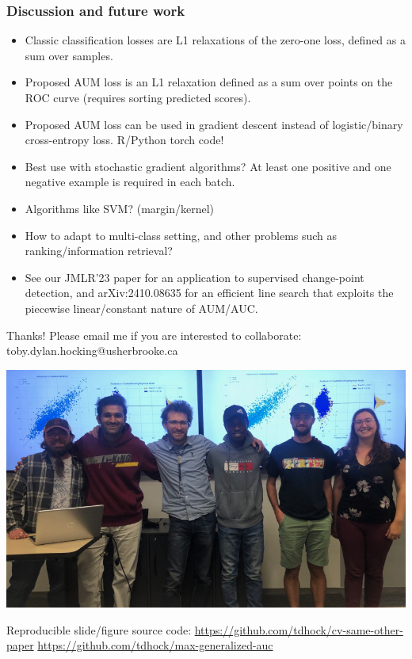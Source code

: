 \documentclass[t]{beamer}
\begin{document}
\begin{frame}
  \frametitle{Discussion and future work}
  \begin{itemize}
  \item Classic classification losses are L1 relaxations of the zero-one loss, defined as a sum over samples.
  \item Proposed AUM loss is an L1 relaxation defined as a sum over
    points on the ROC curve (requires sorting predicted scores).
  \item Proposed AUM loss can be used in gradient descent instead of logistic/binary cross-entropy loss. R/Python torch code!
  \item Best use with stochastic gradient algorithms?
    At least one positive and one negative example is required in each
    batch.
  \item Algorithms like SVM? (margin/kernel)
  \item How to adapt to multi-class setting, and other problems such as
    ranking/information retrieval?
  \item See our JMLR'23 paper for an application to supervised
    change-point detection, and arXiv:2410.08635 for an efficient line
    search that exploits the piecewise linear/constant nature of
    AUM/AUC.
  \end{itemize}
\end{frame}

\begin{frame}
  Thanks! Please email me if you are interested to collaborate: toby.dylan.hocking@usherbrooke.ca

  \includegraphics[width=\textwidth]{2022-10-14_ML_group_meeting}

  Reproducible slide/figure source code: \url{https://github.com/tdhock/cv-same-other-paper} \url{https://github.com/tdhock/max-generalized-auc}
\end{frame}
\end{document}
